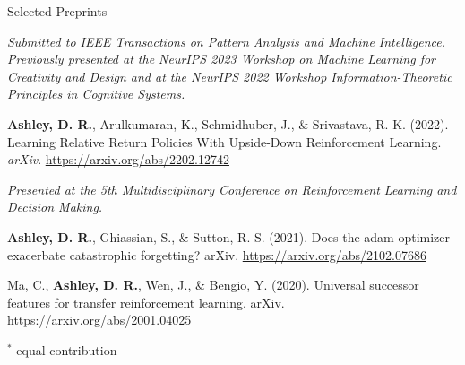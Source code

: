 \documentclass{cv}
\begin{document}
\begin{rSection}{Selected Preprints}
\begin{rPublications}
        \vspace{-0.5em} \textit{Submitted to {IEEE} Transactions on Pattern Analysis and Machine Intelligence. Previously presented at the NeurIPS 2023 Workshop on Machine Learning for Creativity and Design and at the NeurIPS 2022 Workshop Information-Theoretic Principles in Cognitive Systems.}
    \item
        \textbf{Ashley, D. R.}, Arulkumaran, K., Schmidhuber, J., \& Srivastava, R. K.
        (2022).
        Learning Relative Return Policies With Upside-Down Reinforcement Learning.
        \textit{arXiv}.
        \url{https://arxiv.org/abs/2202.12742}

        \vspace{-0.5em} \textit{Presented at the 5th Multidisciplinary Conference on Reinforcement Learning and Decision Making.}
    \item
        \textbf{Ashley, D. R.}, Ghiassian, S., \& Sutton, R. S.
        (2021).
        Does the adam optimizer exacerbate catastrophic forgetting?
        arXiv.
        \url{https://arxiv.org/abs/2102.07686}
    \item
        Ma, C., \textbf{Ashley, D. R.}, Wen, J., \& Bengio, Y.
        (2020).
        Universal successor features for transfer reinforcement learning.
        arXiv.
        \url{https://arxiv.org/abs/2001.04025}
\end{rPublications}

\vspace{-0.3em} \hfill $^*$ \footnotesize{equal contribution} \vspace{-0.7em}

\end{rSection}

\clearpage

\end{document}
